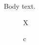 \documentclass{article}
\begin{document}
Body text.
\begin{titlepage}
\begin{figure}[htb]X\caption{c}\end{figure}
\end{titlepage}
\end{document}
